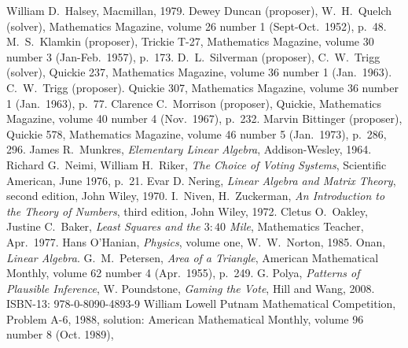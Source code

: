 \begin{thebibliography}{\makebox[2em][c]{{}\hfil{}}}
  William D.~Halsey,
  Macmillan, 1979.
  Dewey Duncan (proposer), W.\ H.\ Quelch (solver),
  Mathematics Magazine,
  volume 26 number 1 (Sept-Oct.\ 1952),
  p.~48.
  M.\ S.\ Klamkin (proposer),
  Trickie T-27,
  Mathematics Magazine,
  volume 30 number 3 (Jan-Feb.\ 1957),
  p.~173.
  D.\ L.\ Silverman (proposer), C.\ W.\ Trigg (solver),
  Quickie 237,
  Mathematics Magazine,
  volume 36 number 1 (Jan.\ 1963).
  C.\ W.\ Trigg (proposer).
  Quickie 307,
  Mathematics Magazine,
  volume 36 number 1 (Jan.\ 1963),
  p.~77.
  Clarence C.\ Morrison (proposer),
  Quickie,
  Mathematics Magazine,
  volume 40 number 4 (Nov.\ 1967),
  p.~232.
  Marvin Bittinger (proposer),
  Quickie 578,
  Mathematics Magazine,
  volume 46 number 5 (Jan.\ 1973),
  p.~286, 296.
  James R.\ Munkres,
  \emph{Elementary Linear Algebra},
  Addison-Wesley,
  1964.
  Richard G.~Neimi, William H.~Riker,
  \emph{The Choice of Voting Systems},
  Scientific American,
  June 1976,
  p.~21.
  Evar D. Nering,
  \emph{Linear Algebra and Matrix Theory},
  second edition,
  John Wiley,
  1970.
  I.\ Niven, H.\ Zuckerman,
  \emph{An Introduction to the Theory of Numbers},
  third edition,
  John Wiley,
  1972.
  Cletus O.\ Oakley, Justine C.\ Baker,
  \emph{Least Squares and the $3:40$ Mile},
  Mathematics Teacher,
  Apr.\ 1977.
  Hans O'Hanian,
  \emph{Physics},
  volume one,
  W.\ W.\ Norton,
  1985.
  Onan,
  \emph{Linear Algebra}.
  G.\ M.\ Petersen,
  \emph{Area of a Triangle},
  American Mathematical Monthly,
  volume 62 number 4 (Apr.\ 1955),
  p.~249.
  G. Polya,
  \emph{Patterns of Plausible Inference},
  W. Poundstone,
  \emph{Gaming the Vote},
  Hill and Wang, 2008.
  ISBN-13: 978-0-8090-4893-9 
  William Lowell Putnam Mathematical Competition,
  Problem A-6, 1988,
  solution: American Mathematical Monthly, 
  volume 96 number 8 (Oct. 1989),

\end{thebibliography}
